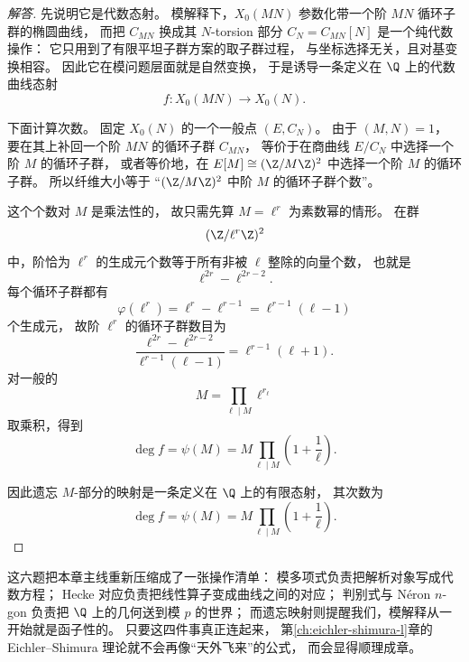 \begin{proof}[解答]
先说明它是代数态射。
模解释下，$X_0(MN)$ 参数化带一个阶 $MN$ 循环子群的椭圆曲线，
而把 $C_{MN}$ 换成其 $N$-torsion 部分 $C_N=C_{MN}[N]$ 是一个纯代数操作：
它只用到了有限平坦子群方案的取子群过程，
与坐标选择无关，且对基变换相容。
因此它在模问题层面就是自然变换，
于是诱导一条定义在 $\Q$ 上的代数曲线态射
\[
  f:X_0(MN)\to X_0(N).
\]

下面计算次数。
固定 $X_0(N)$ 的一个一般点 $(E,C_N)$。
由于 $(M,N)=1$，
要在其上补回一个阶 $MN$ 的循环子群 $C_{MN}$，
等价于在商曲线 $E/C_N$ 中选择一个阶 $M$ 的循环子群，
或者等价地，在 $E[M]\cong (\Z/M\Z)^2$ 中选择一个阶 $M$ 的循环子群。
所以纤维大小等于
“$(\Z/M\Z)^2$ 中阶 $M$ 的循环子群个数”。

这个个数对 $M$ 是乘法性的，
故只需先算 $M=\ell^r$ 为素数幂的情形。
在群
\[
  (\Z/\ell^r\Z)^2
\]
中，阶恰为 $\ell^r$ 的生成元个数等于所有非被 $\ell$ 整除的向量个数，
也就是
\[
  \ell^{2r}-\ell^{2r-2}.
\]
每个循环子群都有
\[
  \varphi(\ell^r)=\ell^r-\ell^{r-1}=\ell^{r-1}(\ell-1)
\]
个生成元，
故阶 $\ell^r$ 的循环子群数目为
\[
  \frac{\ell^{2r}-\ell^{2r-2}}{\ell^{r-1}(\ell-1)}
  =\ell^{r-1}(\ell+1).
\]
对一般的
\[
  M=\prod_{\ell\mid M}\ell^{r_\ell}
\]
取乘积，得到
\[
  \deg f=\psi(M)=M\prod_{\ell\mid M}\left(1+\frac1\ell\right).
\]

因此遗忘 $M$-部分的映射是一条定义在 $\Q$ 上的有限态射，
其次数为
\[
  \deg f=\psi(M)=M\prod_{\ell\mid M}\left(1+\frac1\ell\right).
\]
\end{proof}

这六题把本章主线重新压缩成了一张操作清单：
模多项式负责把解析对象写成代数方程；
Hecke 对应负责把线性算子变成曲线之间的对应；
判别式与 N\'eron $n$-gon 负责把 $\Q$ 上的几何送到模 $p$ 的世界；
而遗忘映射则提醒我们，模解释从一开始就是函子性的。
只要这四件事真正连起来，
第\ref{ch:eichler-shimura-l}章的 Eichler--Shimura 理论就不会再像“天外飞来”的公式，
而会显得顺理成章。
